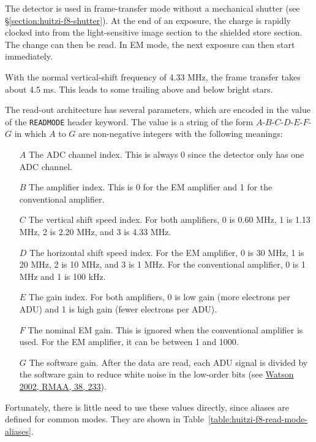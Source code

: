 The detector is used in frame-transfer mode without a mechanical shutter (see \S\ref{section:huitzi-f8-shutter}). At the end of an exposure, the charge is rapidly clocked into from the light-sensitive image section to the shielded store section. The change can then be read. In EM mode, the next exposure can then start immediately.

With the normal vertical-shift frequency of 4.33 MHz, the frame transfer takes about 4.5 ms. This leads to some trailing above and below bright stars.

The read-out architecture has several parameters, which are encoded in the value of the \verb|READMODE| header keyword. The value is a string of the form $A$-$B$-$C$-$D$-$E$-$F$-$G$ in which $A$ to $G$ are non-negative integers with the following meanings:

\begin{itemize}
\item[$A$] The ADC channel index. This is always 0 since the detector only has one ADC channel.
\item[$B$] The amplifier index. This is 0 for the EM amplifier and 1 for the conventional amplifier.
\item[$C$] The vertical shift speed index. For both amplifiers, 0 is 0.60 MHz, 1 is 1.13 MHz, 2 is 2.20 MHz, and 3 is 4.33 MHz. 
\item[$D$] The horizontal shift speed index. For the EM amplifier, 0 is 30 MHz, 1 is 20 MHz, 2 is 10 MHz, and 3 is 1 MHz. For the conventional amplifier, 0 is 1 MHz and 1 is 100 kHz.
\item[$E$] The gain index. For both amplifiers, 0 is low gain (more electrons per ADU) and 1 is high gain (fewer electrons per ADU).
\item[$F$] The nominal EM gain. This is ignored when the conventional amplifier is used. For the EM amplifier, it can be between 1 and 1000.
\item[$G$] The software gain. After the data are read, each ADU signal is divided by the software gain to reduce white noise in the low-order bits (see \href{https://ui.adsabs.harvard.edu/abs/2002RMxAA..38..233W/abstract}{Watson 2002, RMAA, 38, 233}).
\end{itemize}

Fortunately, there is little need to use these values directly, since aliases are defined for common modes. They are shown in Table~\ref{table:huitzi-f8-read-mode-aliases}.

